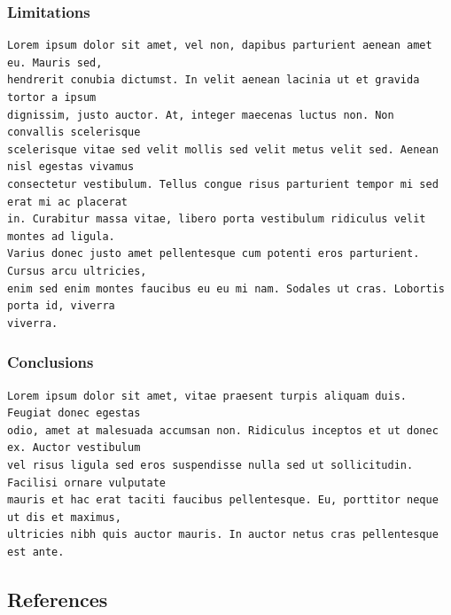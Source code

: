\documentclass{article}
\begin{document}
\hypertarget{limitations}{%
\subsubsection{Limitations}\label{limitations}}

\begin{verbatim}
Lorem ipsum dolor sit amet, vel non, dapibus parturient aenean amet eu. Mauris sed,
hendrerit conubia dictumst. In velit aenean lacinia ut et gravida tortor a ipsum
dignissim, justo auctor. At, integer maecenas luctus non. Non convallis scelerisque
scelerisque vitae sed velit mollis sed velit metus velit sed. Aenean nisl egestas vivamus
consectetur vestibulum. Tellus congue risus parturient tempor mi sed erat mi ac placerat
in. Curabitur massa vitae, libero porta vestibulum ridiculus velit montes ad ligula.
Varius donec justo amet pellentesque cum potenti eros parturient. Cursus arcu ultricies,
enim sed enim montes faucibus eu eu mi nam. Sodales ut cras. Lobortis porta id, viverra
viverra.
\end{verbatim}

\hypertarget{conclusions}{%
\subsubsection{Conclusions}\label{conclusions}}

\begin{verbatim}
Lorem ipsum dolor sit amet, vitae praesent turpis aliquam duis. Feugiat donec egestas
odio, amet at malesuada accumsan non. Ridiculus inceptos et ut donec ex. Auctor vestibulum
vel risus ligula sed eros suspendisse nulla sed ut sollicitudin. Facilisi ornare vulputate
mauris et hac erat taciti faucibus pellentesque. Eu, porttitor neque ut dis et maximus,
ultricies nibh quis auctor mauris. In auctor netus cras pellentesque est ante.
\end{verbatim}

\newpage

\hypertarget{references}{%
\subsection{References}\label{references}}

\label{sec:bibliography}
\end{document}
